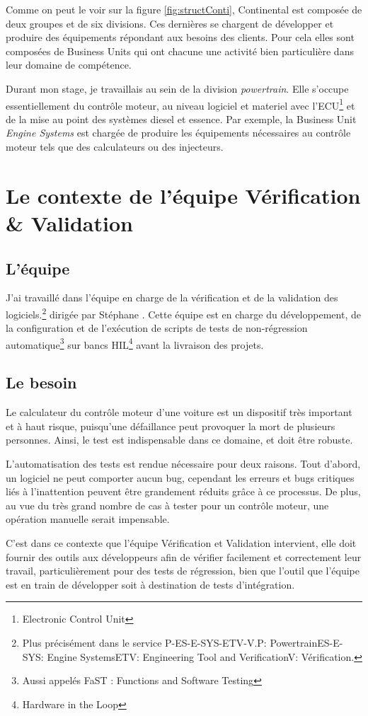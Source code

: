 		Comme on peut le voir sur la figure \ref{fig:structConti}, Continental est composée de deux groupes et de six divisions. Ces dernières se chargent de développer et produire des équipements répondant aux besoins des clients. Pour cela elles sont composées de Business Units qui ont chacune une activité bien particulière dans leur domaine de compétence. 

Durant mon stage, je travaillais au sein de la division \textit{powertrain}. Elle s'occupe essentiellement du contrôle moteur, au niveau logiciel et materiel avec l'ECU\footnote{Electronic Control Unit} et de la mise au point des systèmes diesel et essence. Par exemple, la Business Unit \textit{Engine Systems} est chargée de produire les équipements nécessaires au contrôle moteur tels que des calculateurs ou des 
injecteurs.

	\section{Le contexte de l'équipe Vérification \& Validation}
		\subsection{L'équipe}
		J'ai travaillé dans l'équipe en charge de la vérification et de la validation des logiciels.\footnote{Plus précisément dans le service P-ES-E-SYS-ETV-V.\newline P: Powertrain\newline ES-E-SYS: Engine Systems\newline ETV: Engineering Tool and Verification\newline V: Vérification.} dirigée par Stéphane . Cette équipe est en charge du développement, de la configuration et de l'exécution de scripts de tests de non-régression automatique\footnote{Aussi appelés FaST : Functions and Software Testing} sur bancs HIL\footnote{Hardware in the Loop} avant la livraison des projets.
		
		\subsection{Le besoin} \label{besoinTests}
		Le calculateur du contrôle moteur d'une voiture est un dispositif très important et à haut risque, puisqu'une défaillance peut provoquer la mort de plusieurs personnes. Ainsi, le test est indispensable dans ce domaine, et doit être robuste. 

L'automatisation des tests est rendue nécessaire pour deux raisons. Tout d'abord, un logiciel ne peut comporter aucun bug, cependant les erreurs et bugs critiques liés à l'inattention peuvent être grandement réduits grâce à ce processus. De plus, au vue du très grand nombre de cas à tester pour un contrôle moteur, une opération manuelle serait impensable. 

C'est dans ce contexte que l'équipe Vérification et Validation intervient, elle doit fournir des outils aux développeurs afin de vérifier facilement et correctement leur travail, particulièrement pour des tests de régression, bien que l'outil que l'équipe est en train de développer soit à destination de tests d'intégration.

